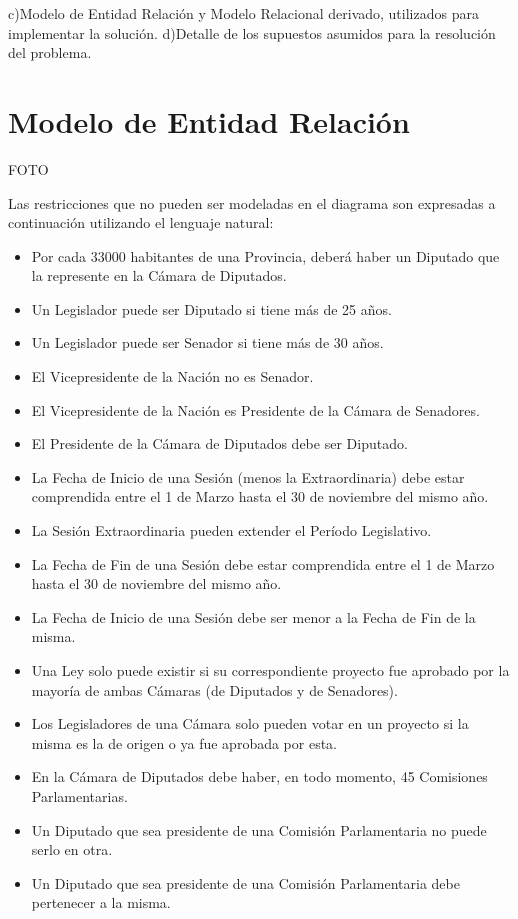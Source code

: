 c)Modelo de Entidad Relación y Modelo Relacional derivado, utilizados para implementar la solución.
d)Detalle de los supuestos asumidos para la resolución del problema.


\section{Modelo de Entidad Relación}

FOTO


Las restricciones que no pueden ser modeladas en el diagrama son expresadas a continuación utilizando el lenguaje natural:
\begin{itemize}
	\item Por cada 33000 habitantes de una Provincia, deberá haber un Diputado que la represente en la Cámara de Diputados. 
	\item Un Legislador puede ser Diputado si tiene más de 25 años.
	\item Un Legislador puede ser Senador si tiene más de 30 años.
	\item El Vicepresidente de la Nación no es Senador.
	\item El Vicepresidente de la Nación es Presidente de la Cámara de Senadores. 
	\item El Presidente de la Cámara de Diputados debe ser Diputado. 
	\item La Fecha de Inicio de una Sesión (menos la Extraordinaria) debe estar comprendida entre el 1 de Marzo hasta el 30 de noviembre del mismo año.	
	\item La Sesión Extraordinaria pueden extender el Período Legislativo. 
	\item La Fecha de Fin de una Sesión debe estar comprendida entre el 1 de Marzo hasta el 30 de noviembre del mismo año.
	\item La Fecha de Inicio de una Sesión debe ser menor a la Fecha de Fin de la misma. 
	\item Una Ley solo puede existir si su correspondiente proyecto fue aprobado por la mayoría de ambas Cámaras (de Diputados y de Senadores).
	\item Los Legisladores de una Cámara solo pueden votar en un proyecto si la misma es la de origen o ya fue aprobada por esta.
	\item En la Cámara de Diputados debe haber, en todo momento, 45 Comisiones Parlamentarias.
	\item Un Diputado que sea presidente de una Comisión Parlamentaria no puede serlo en otra.   
	\item Un Diputado que sea presidente de una Comisión Parlamentaria debe pertenecer a la misma. 

\end{itemize}
